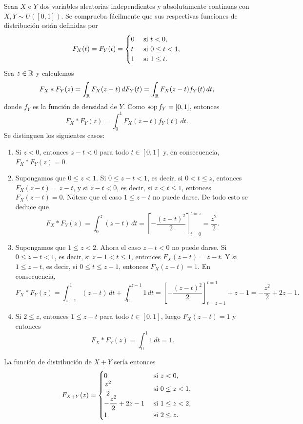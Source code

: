 \documentclass[a4paper, 11pt, extrafontsizes]{memoir}
\begin{document}
\begin{example}
    Sean $X$ e $Y$ dos variables aleatorias independientes y absolutamente continuas con $X,Y \sim U([0,1])$. Se comprueba fácilmente que sus respectivas funciones de distribución están definidas por
    \[F_X(t)=F_Y(t)=\begin{cases}
        0 & $ si $ t < 0, \\
        t & $ si $ 0 \leq t < 1, \\
        1 & $ si $ 1 \leq t.
    \end{cases}\]
    Sea $z \in \mathbb R$ y calculemos
    \[F_X \ast F_Y(z)=\int_{\mathbb R} F_X(z-t) \, dF_Y(t) = \int_\mathbb R F_X(z-t)f_Y(t) \, dt,\]
    donde $f_Y$ es la función de densidad de $Y$. Como $\textup{sop}\, f_Y = [0,1]$, entonces
    \[F_X \ast F_Y(z)= \int_0^1 F_X(z-t)f_Y(t) \, dt.\]
    Se distinguen los siguientes casos:
    \begin{enumerate}
        \item Si $z < 0$, entonces $z-t < 0$ para todo $t \in [0,1]$ y, en consecuencia, $F_X \ast F_Y(z)=0$.
        \item Supongamos que $0 \leq z < 1$. Si $0 \leq z -t < 1$, es decir, si $0 < t \leq z$, entonces
        $F_X(z-t) = z-t$, y si $z - t <0$, es decir, si $z< t \leq 1$, entonces $F_X(z-t) = 0$. Nótese que el caso $1 \leq z-t$ no puede darse. De todo esto se deduce que
        \[F_X \ast F_Y(z) = \int_0^z (z-t) \, dt =\left[-\frac{(z-t)^2}{2}\right]_{t=0}^{t=z} = \frac{z^2}{2}.\]
        \item  Supongamos que $1 \leq z < 2$. Ahora el caso $z-t < 0$ no puede darse. Si $0 \leq z-t< 1$, es decir, si $z-1 < t \leq 1$, entonces $F_X(z-t) = z-t$. Y si $1 \leq z-t$, es decir, si $0 \leq t \leq z-1$, entonces $F_X(z-t) = 1$. En consecuencia,
        \[F_X \ast F_Y(z)=\int_{z-1}^1 (z-t) \, dt + \int_0^{z-1} 1 \, dt = \left[-\frac{(z-t)^2}{2}\right]_{t=z-1}^{t=1} + z-1 = -\frac{z^2}{2}+2z-1.\]
        \item Si $2 \leq z$, entonces $1 \leq z-t$ para todo $t \in [0,1]$, luego $F_X(z-t) = 1$ y entonces
        \[F_X \ast F_Y(z) = \int_0^1 1 \, dt = 1.\]
    \end{enumerate}
    La función de distribución de $X+Y$ sería entonces
    \[F_{X+Y}(z)=\begin{cases}
        0 & $ si $ z < 0, \\
        \displaystyle \frac{z^2}{2} & $ si $ 0 \leq z < 1, \\
        \displaystyle -\frac{z^2}{2} + 2z -1 & $ si $ 1 \leq z < 2, \\
        1 & $ si $ 2 \leq z.
    \end{cases}\]
\end{example}
\end{document}

